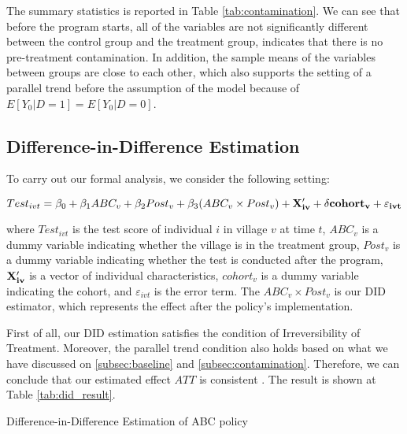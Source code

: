 \documentclass[12pt]{jfm}
\begin{document}
The summary statistics is reported in Table \ref{tab:contamination}. We can see that before the program starts, all of the variables are not significantly different between the control group and the treatment group, indicates that there is no pre-treatment contamination. In addition, the sample means of the variables between groups are close to each other, which also supports the setting of a parallel trend before the assumption of the model because of $E[Y_0\big|D = 1] = E[Y_0\big|D = 0]$.

\subsection{Difference-in-Difference Estimation} \label{subsec:did}

To carry out our formal analysis, we consider the following setting:

\begin{equation}
 Test_{ivt} = \beta_0 + \beta_1 ABC_{v} + \beta_2 Post_{v} + \beta_3 (ABC_v \times Post_v) + \bf{X}_{iv}^\prime + \delta cohort_{v} + \varepsilon_{ivt} \label{eq:did_baseline}  
\end{equation}

where $Test_{ivt}$ is the test score of individual $i$ in village $v$ at time $t$, $ABC_v$ is a dummy variable indicating whether the village is in the treatment group, $Post_v$ is a dummy variable indicating whether the test is conducted after the program, $\bf{X}_{iv}^\prime$ is a vector of individual characteristics, $cohort_{v}$ is a dummy variable indicating the cohort, and $\varepsilon_{ivt}$ is the error term. The $ABC_v \times Post_v$ is our DID estimator, which represents the effect after the policy's implementation.

First of all, our DID estimation satisfies the condition of Irreversibility of Treatment. Moreover, the parallel trend condition also holds based on what we have discussed on \ref{subsec:baseline} and \ref{subsec:contamination}. Therefore, we can conclude that our estimated effect $ATT$ is consistent \citep{CALLAWAY2021200}. The result is shown at Table \ref{tab:did_result}.

\begin{table}
  \begin{center}
    \begin{footnotesize}
    \caption{Difference-in-Difference Estimation of ABC policy}
    \label{tab:did_result}
    
    \end{footnotesize}
  \end{center}
\end{table}
\end{document}
